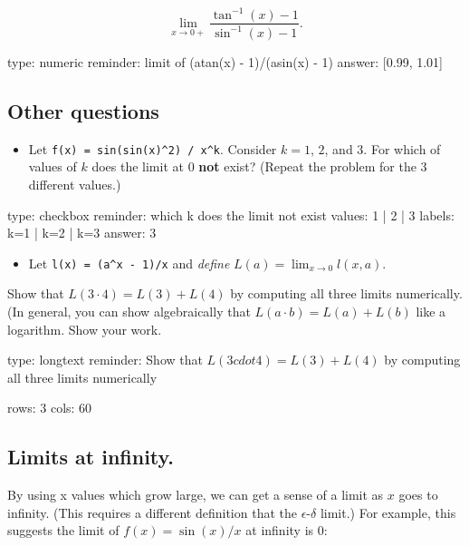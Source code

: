 \documentclass[12pt]{article}
\begin{document}
\[
\lim_{x \rightarrow 0+} \frac{\tan^{-1}(x) - 1}{\sin^{-1}(x) - 1}.
\]

\begin{answer}
    type: numeric
    reminder: limit of   (atan(x) - 1)/(asin(x) - 1)
    answer: [0.99, 1.01]

\end{answer}

\subsection{Other questions}

\begin{itemize}
\itemsep1pt\parskip0pt
\item
  Let \texttt{f(x) = sin(sin(x)\^{}2) / x\^{}k}. Consider $k=1$, $2$,
  and $3$. For which of values of $k$ does the limit at $0$ \textbf{not}
  exist? (Repeat the problem for the 3 different values.)
\end{itemize}

\begin{answer}
type: checkbox
reminder: which k does the limit not exist
values: 1 | 2 | 3
labels: k=1 | k=2 | k=3
answer: 3
\end{answer}

\begin{itemize}
\itemsep1pt\parskip0pt
\item
  Let \texttt{l(x) = (a\^{}x - 1)/x} and \emph{define}
  $L(a) = \lim_{x\rightarrow 0} l(x,a)$.
\end{itemize}

Show that $L(3 \cdot 4) = L(3) + L(4)$ by computing all three limits
numerically. (In general, you can show algebraically that
$L(a\cdot b) = L(a) + L(b)$ like a logarithm. Show your work.

\begin{answer}
type: longtext
reminder: Show that \( L(3 cdot 4) = L(3) + L(4) \) by computing all three limits numerically

rows: 3
cols: 60
\end{answer}

\subsection{Limits at infinity.}

By using x values which grow large, we can get a sense of a limit as $x$
goes to infinity. (This requires a different definition that the
$\epsilon$-$\delta$ limit.) For example, this suggests the limit of
$f(x) = \sin(x)/x$ at infinity is $0$:
\end{document}
